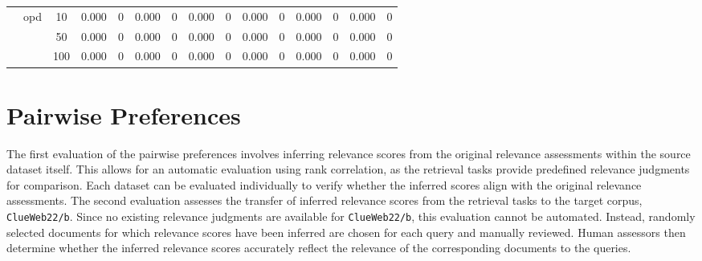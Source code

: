 \begin{table}[t]
{\begin{tabular}{ccccccccccccccc}
        \cmidrule(lr){2-15}
                                                        & \multirow{3}{*}{opd}  &  10 & 0.000 & 0 & 0.000 & 0 & 0.000 & 0 & 0.000 & 0 & 0.000 & 0 & 0.000 & 0 \\
                                                                             &  &  50 & 0.000 & 0 & 0.000 & 0 & 0.000 & 0 & 0.000 & 0 & 0.000 & 0 & 0.000 & 0 \\
                                                                             &  & 100 & 0.000 & 0 & 0.000 & 0 & 0.000 & 0 & 0.000 & 0 & 0.000 & 0 & 0.000 & 0 \\

        \bottomrule 
    \end{tabular}}
    \renewcommand{\arraystretch}{1.0}
\end{table}


\section{Pairwise Preferences}\label{eval-pairwise-preferences}

The first evaluation of the pairwise preferences involves inferring relevance scores from the original relevance assessments within the source dataset itself. This allows for an automatic evaluation using rank correlation, as the retrieval tasks provide predefined relevance judgments for comparison. Each dataset can be evaluated individually to verify whether the inferred scores align with the original relevance assessments. The second evaluation assesses the transfer of inferred relevance scores from the retrieval tasks to the target corpus, \texttt{ClueWeb22/b}. Since no existing relevance judgments are available for \texttt{ClueWeb22/b}, this evaluation cannot be automated. Instead, randomly selected documents for which relevance scores have been inferred are chosen for each query and manually reviewed. Human assessors then determine whether the inferred relevance scores accurately reflect the relevance of the corresponding documents to the queries.

